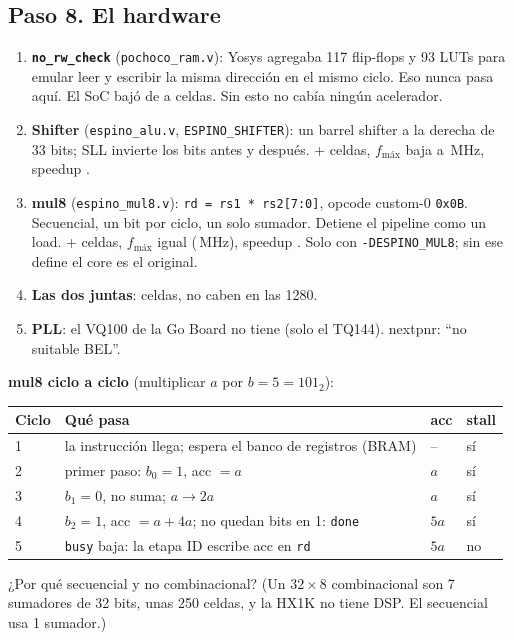 \documentclass[11pt,letterpaper]{article}
\begin{document}
\subsection*{Paso 8. El hardware}
\begin{enumerate}
\item \textbf{\texttt{no\_rw\_check}} (\texttt{pochoco\_ram.v}): Yosys agregaba 117 flip-flops y 93 LUTs
  para emular leer y escribir la misma dirección en el mismo ciclo. Eso nunca pasa aquí. El SoC bajó de
  \LCOriginal{} a \LCSw{} celdas. Sin esto no cabía ningún acelerador.
\item \textbf{Shifter} (\texttt{espino\_alu.v}, \texttt{ESPINO\_SHIFTER}): un barrel shifter a la derecha
  de 33 bits; SLL invierte los bits antes y después. +\CostoShift{} celdas, $f_\text{máx}$ baja a
  \FmaxShift\,MHz, speedup \SpeedupShift.
\item \textbf{mul8} (\texttt{espino\_mul8.v}): \texttt{rd = rs1 * rs2[7:0]}, opcode custom-0
  \texttt{0x0B}. Secuencial, un bit por ciclo, un solo sumador. Detiene el pipeline como un load.
  +\CostoMul{} celdas, $f_\text{máx}$ igual (\FmaxMul\,MHz), speedup \SpeedupMul. Solo con
  \texttt{-DESPINO\_MUL8}; sin ese define el core es el original.
\item \textbf{Las dos juntas}: \LCMulShift{} celdas, no caben en las 1280.
\item \textbf{PLL}: el VQ100 de la Go Board no tiene (solo el TQ144). nextpnr: ``no suitable BEL''.
\end{enumerate}

\textbf{mul8 ciclo a ciclo} (multiplicar $a$ por $b = 5 = 101_2$):
\begin{center}\small
\begin{tabular}{llll}
\toprule
Ciclo & Qué pasa & acc & stall \\
\midrule
1 & la instrucción llega; espera el banco de registros (BRAM) & -- & sí \\
2 & primer paso: $b_0 = 1$, acc $= a$ & $a$ & sí \\
3 & $b_1 = 0$, no suma; $a \to 2a$ & $a$ & sí \\
4 & $b_2 = 1$, acc $= a + 4a$; no quedan bits en 1: \texttt{done} & $5a$ & sí \\
5 & \texttt{busy} baja: la etapa ID escribe acc en \texttt{rd} & $5a$ & no \\
\bottomrule
\end{tabular}
\end{center}
\begin{checkpoint}
¿Por qué secuencial y no combinacional? (Un $32\times 8$ combinacional son 7 sumadores de 32 bits, unas
250 celdas, y la HX1K no tiene DSP. El secuencial usa 1 sumador.)
\end{checkpoint}
\end{document}
